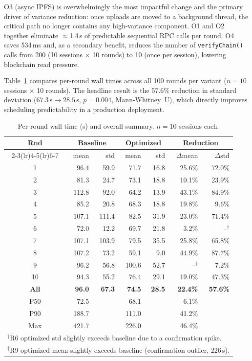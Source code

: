 \documentclass{llncs}
\begin{document}
O3 (async IPFS) is overwhelmingly the most impactful change and the primary
driver of variance reduction: once uploads are moved to a background thread,
the critical path no longer contains any high-variance component. O1 and O2
together eliminate $\approx$1.4\,s of predictable sequential RPC calls per
round. O4 saves 534\,ms and, as a secondary benefit, reduces the number of
\texttt{verifyChain()} calls from 200 (10 sessions $\times$ 10 rounds) to
10 (once per session), lowering blockchain read pressure.

Table~\ref{tab:walltime} compares per-round wall times across all
100 rounds per variant ($n=10$ sessions $\times$ 10 rounds). The headline
result is the $57.6\%$ reduction in standard deviation
($67.3\,\text{s}\rightarrow28.5\,\text{s}$, $p{=}0.004$, Mann-Whitney~U),
which directly improves scheduling predictability in a production deployment.

\begin{table}[t]
\caption{Per-round wall time (s) and overall summary. $n=10$ sessions each.}
\label{tab:walltime}
\centering\footnotesize
\setlength{\tabcolsep}{4pt}
\begin{tabular}{c rr rr rr}
\toprule
\multirow{2}{*}{\textbf{Rnd}}
  & \multicolumn{2}{c}{\textbf{Baseline}}
  & \multicolumn{2}{c}{\textbf{Optimized}}
  & \multicolumn{2}{c}{\textbf{Reduction}} \\
\cmidrule(lr){2-3}\cmidrule(lr){4-5}\cmidrule(lr){6-7}
& mean & std & mean & std & $\Delta$mean & $\Delta$std \\
\midrule
 1 & 96.4  & 59.9  & 71.7  & 16.8  & 25.6\% & 72.0\% \\
 2 & 81.3  & 24.7  & 73.1  & 18.8  & 10.1\% & 23.9\% \\
 3 & 112.8 & 92.0  & 64.2  & 13.9  & 43.1\% & 84.9\% \\
 4 & 85.2  & 20.8  & 68.3  & 18.8  & 19.8\% & 9.6\%  \\
 5 & 107.1 & 111.4 & 82.5  & 31.9  & 23.0\% & 71.4\% \\
 6 & 72.0  & 12.2  & 69.7  & 21.8  &  3.2\% & --$^{\dagger}$ \\
 7 & 107.1 & 103.9 & 79.5  & 35.5  & 25.8\% & 65.8\% \\
 8 & 107.2 & 73.2  & 59.1  &  9.0  & 44.9\% & 87.7\% \\
 9 & 96.2  & 56.8  & 100.6 & 52.7  & --$^{\ddagger}$ & 7.2\% \\
10 & 94.3  & 55.2  & 76.4  & 29.1  & 19.0\% & 47.3\% \\
\midrule
\textbf{All} & \textbf{96.0} & \textbf{67.3} & \textbf{74.5} & \textbf{28.5}
  & \textbf{22.4\%} & \textbf{57.6\%} \\
P50 & 72.5 & & 68.1 && 6.1\% & \\
P90 & 188.7 & & 111.0 && 41.2\% & \\
Max & 421.7 & & 226.0 && 46.4\% & \\
\bottomrule
\multicolumn{7}{l}{$^{\dagger}$R6 optimized std slightly exceeds baseline due to a confirmation spike.} \\
\multicolumn{7}{l}{$^{\ddagger}$R9 optimized mean slightly exceeds baseline (confirmation outlier, 226\,s).}
\end{tabular}
\end{table}
\end{document}
